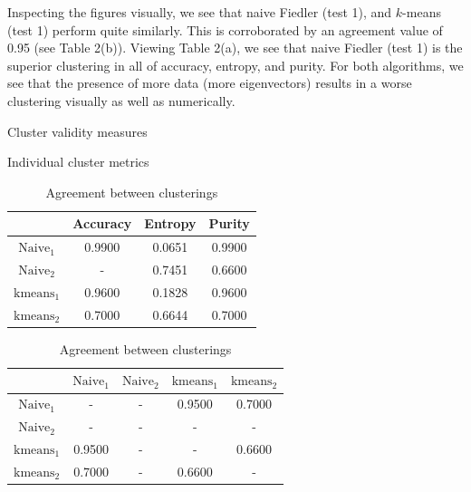 \documentclass[11pt, letterpaper]{article}
\theoremstyle{perchance}
\begin{document}
    Inspecting the figures visually, we see that naive Fiedler (test 1), and $k$-means (test 1) perform quite similarly. This is corroborated by an agreement value of 0.95 (see Table 2(b)). Viewing Table 2(a), we see that naive Fiedler (test 1) is the superior clustering in all of accuracy, entropy, and purity. For both algorithms, we see that the presence of more data (more eigenvectors) results in a worse clustering visually as well as numerically. 

    \begin{table}[h!]%
    \centering
    \caption{Cluster validity measures}
    \begin{subtable}[t]{.4\textwidth}
        \caption{Individual cluster metrics}
        \raggedright
        \begin{tabular}{|c|c|c|c|} \hline
                              & Accuracy & Entropy & Purity \\ \hline
            $\text{Naive}_1$  &   0.9900 &  0.0651 & 0.9900 \\ \hline
            $\text{Naive}_2$  &        - &  0.7451 & 0.6600 \\ \hline
            $\text{kmeans}_1$ &   0.9600 &  0.1828 & 0.9600 \\ \hline
            $\text{kmeans}_2$ &   0.7000 &  0.6644 & 0.7000 \\ \hline
        \end{tabular}
    \end{subtable}%
    \begin{subtable}[t]{.55\textwidth}
        \raggedleft
        \caption{Agreement between clusterings}
        \begin{tabular}{|c|c|c|c|c|} \hline
                              & $\text{Naive}_1$ & $\text{Naive}_2$ & $\text{kmeans}_1$ & $\text{kmeans}_2$ \\ \hline
            $\text{Naive}_1$  &                - &                - &            0.9500 &            0.7000 \\ \hline
            $\text{Naive}_2$  &                - &                - &                 - &                 - \\ \hline
            $\text{kmeans}_1$ &           0.9500 &                - &                 - &            0.6600 \\ \hline
            $\text{kmeans}_2$ &           0.7000 &                - &            0.6600 &                 - \\ \hline
        \end{tabular}
    \end{subtable}
    \end{table}
\end{document}
